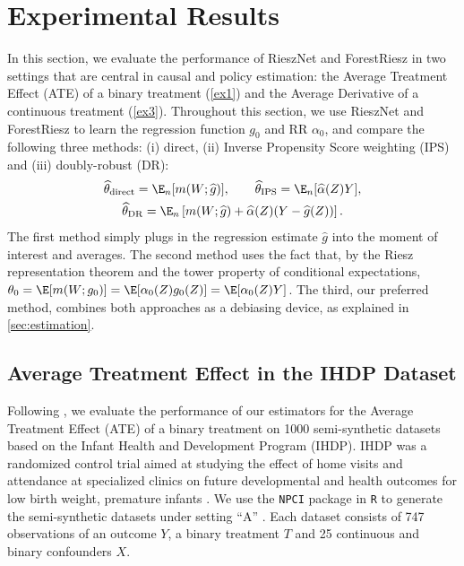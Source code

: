 \documentclass[nohyperref]{article}
\newcommand{\wt}{\widehat{\theta}}
\theoremstyle{plain}
\theoremstyle{definition}
\theoremstyle{remark}
\begin{document}
\section{Experimental Results}\label{sec:experiments}
In this section, we evaluate the performance of RieszNet and ForestRiesz in two settings that are central in causal and policy estimation: the Average Treatment Effect (ATE) of a binary treatment (\cref{ex1}) and the Average Derivative of a continuous treatment (\cref{ex3}). Throughout this section, we use RieszNet and ForestRiesz to learn the regression function $g_0$ and RR $\alpha_0$, and compare the following three methods: (i) direct, (ii) Inverse Propensity Score weighting (IPS) and (iii) doubly-robust (DR): 
\begin{gather*}
\wt_{\mathrm{direct}} = \E_n[m(W; \widehat{g})], \qquad \wt_{\mathrm{IPS}} = \E_n[\widehat{\alpha}(Z) Y], \\
\wt_{\mathrm{DR}} = \E_n\left[m(W; \widehat{g}) + \widehat\alpha(Z)(Y-\widehat{g}(Z))\right].
\end{gather*}
The first method simply plugs in the regression estimate $\widehat{g}$ into the moment of interest and averages. The second method uses the fact that, by the Riesz representation theorem and the tower property of conditional expectations, $\theta_0 = \E[m(W; g_0)] = \E[\alpha_0(Z) g_0(Z)] = \E[\alpha_0(Z) Y]$. The third, our preferred method, combines both approaches as a debiasing device, as explained in \cref{sec:estimation}.

\subsection{Average Treatment Effect in the IHDP Dataset}
Following \citet{shi2019adapting}, we evaluate the performance of our estimators for the Average Treatment Effect (ATE) of a binary treatment on 1000 semi-synthetic datasets based on the Infant Health and Development Program (IHDP). IHDP was a randomized control trial aimed at studying the effect of home visits and attendance at specialized clinics on future developmental and health outcomes for low birth weight, premature infants \citep{gross1993infant}. We use the \texttt{NPCI} package in \texttt{R} to generate the semi-synthetic datasets under setting ``A'' \citep{dorie2016non}. Each dataset consists of 747 observations of an outcome $Y$, a binary treatment $T$ and 25 continuous and binary confounders $X$.
\end{document}
